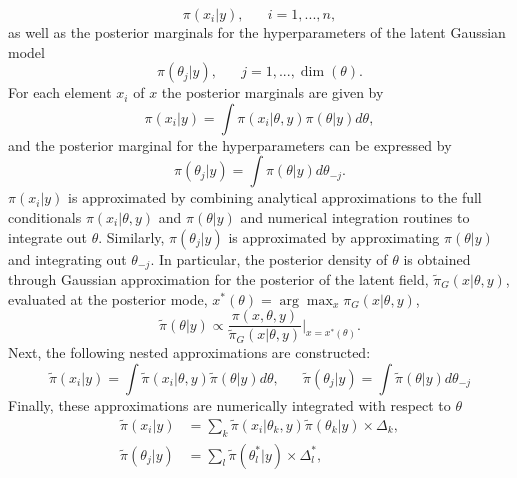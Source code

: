 \documentclass[12pt]{book}
\begin{document}
\begin{equation*}
    \pi\left(x_i|y\right),\hspace{20pt}i=1,...,n,
\end{equation*}
as well as the posterior marginals for the hyperparameters of the latent Gaussian model
\begin{equation*}
    \pi\left(\theta_j|y\right),\hspace{20pt}j=1,...,\dim\left(\theta\right).
\end{equation*}
For each element $x_i$ of $x$ the posterior marginals are given by
\begin{equation}
    \pi\left(x_i|y\right)=\int\pi\left(x_i|\theta,y\right)\pi\left(\theta|y\right)d\theta,
\end{equation}
and the posterior marginal for the hyperparameters can be expressed by
\begin{equation}
    \pi\left(\theta_j|y\right)=\int\pi\left(\theta|y\right)d\theta_{-j}.
\end{equation}
$\pi\left(x_i|y\right)$ is approximated by combining analytical approximations to the full conditionals $\pi\left(x_i|\theta,y\right)$ and $\pi\left(\theta|y\right)$ and numerical integration routines to integrate out $\theta$. Similarly, $\pi\left(\theta_j|y\right)$ is approximated by approximating $\pi\left(\theta|y\right)$ and integrating out $\theta_{-j}$. In particular, the posterior density of $\theta$ is obtained through Gaussian approximation for the posterior of the latent field, $\widetilde{\pi}_G\left(x|\theta,y\right)$, evaluated at the posterior mode, $x^*\left(\theta\right)=\arg\max_x\pi_G\left(x|\theta,y\right)$,
\begin{equation}
    \widetilde{\pi}\left(\theta|y\right)\propto\frac{\pi\left(x,\theta,y\right)}{\widetilde{\pi}_G\left(x|\theta,y\right)}\bigg|_{x=x^*\left(\theta\right)}.
\end{equation}
Next, the following nested approximations are constructed:
\begin{equation}
    \widetilde{\pi}\left(x_i|y\right)=\int\widetilde{\pi}\left(x_i|\theta,y\right)\widetilde{\pi}\left(\theta|y\right)d\theta,\hspace{20pt}\widetilde{\pi}\left(\theta_j|y\right)=\int\widetilde{\pi}\left(\theta|y\right)d\theta_{-j}
\end{equation}
Finally, these approximations are numerically integrated with respect to $\theta$
\begin{align}
    \widetilde{\pi}\left(x_i|y\right)&=\sum_k\widetilde{\pi}\left(x_i|\theta_k,y\right)\widetilde{\pi}\left(\theta_k|y\right)\times\Delta_k,\\
    \widetilde{\pi}\left(\theta_j|y\right)&=\sum_l\widetilde{\pi}\left(\theta_l^*|y\right)\times\Delta_l^*,
\end{align}
\end{document}
